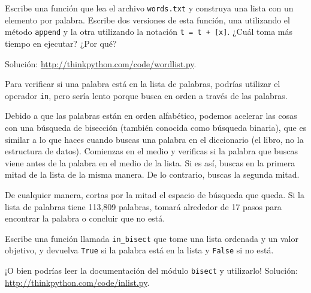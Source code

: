 \documentclass[10pt]{book}
\begin{document}
\begin{exercise}

Escribe una función que lea el archivo {\tt words.txt} y construya
una lista con un elemento por palabra.  Escribe dos versiones de
esta función, una utilizando el método {\tt append} y la
otra utilizando la notación {\tt t = t + [x]}.  ¿Cuál toma más
tiempo en ejecutar?  ¿Por qué?

Solución: \url{http://thinkpython.com/code/wordlist.py}.

\end{exercise}


\begin{exercise}
\label{wordlist1}
\label{bisection}

Para verificar si una palabra está en la lista de palabras, podrías utilizar
el operador {\tt in}, pero sería lento porque busca
en orden a través de las palabras.

Debido a que las palabras están en orden alfabético, podemos acelerar las cosas
con una búsqueda de bisección (también conocida como búsqueda binaria), que es
similar a lo que haces cuando buscas una palabra en el diccionario (el libro, no la estructura de datos).
Comienzas en el medio y verificas si la palabra que buscas
viene antes de la palabra en el medio de la lista.  Si es así,
buscas en la primera mitad de la lista de la misma manera.  De lo contrario, buscas
la segunda mitad.

De cualquier manera, cortas por la mitad el espacio de búsqueda que queda.  Si la
lista de palabras tiene 113,809 palabras, tomará alrededor de 17 pasos
para encontrar la palabra o concluir que no está.

Escribe una función llamada \verb"in_bisect" que tome una lista ordenada
y un valor objetivo, y devuelva {\tt True} si la palabra está
en la lista y {\tt False} si no está.

¡O bien podrías leer la documentación del módulo {\tt bisect}
y utilizarlo!  Solución: \url{http://thinkpython.com/code/inlist.py}.

\end{exercise}
\end{document}
